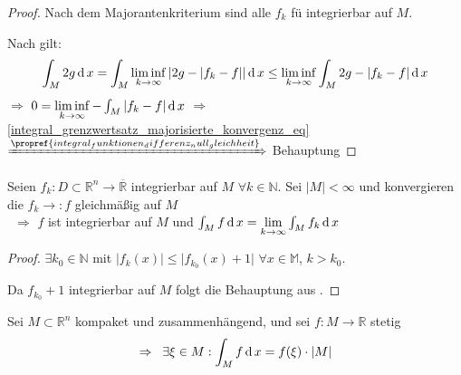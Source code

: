 \begin{proof}
	Nach dem Majorantenkriterium sind alle $f_k$ \gls{fü} integrierbar auf $M$.
	
	Nach  gilt:\begin{align*}
		\int_M 2g \operatorname{d} x = \int_M \liminf\limits_{k\to\infty} \vert 2g - \vert f_k - f\vert \vert \operatorname{d} x \le \liminf\limits_{k\to\infty} \int_M 2g - \vert f_k - f \vert \operatorname{d} x
	\end{align*}
	$\Rightarrow$ $0 = \liminf\limits_{k\to\infty} -\int_M \vert f_k - f\vert \operatorname{d} x$ $\Rightarrow$ \eqref{integral_grenzwertsatz_majorisierte_konvergenz_eq} $\xRightarrow{\propref{integral_funktionen_differenz_null_gleichheit}}$ Behauptung
\end{proof}

\begin{conclusion}
	Seien $f_k:D\subset\mathbb{R}^n\to\overline{\mathbb{R}}$ integrierbar auf $M$ $\forall k\in\mathbb{N}$. Sei $\vert M \vert < \infty$ und konvergieren die $f_k \to: f$ gleichmäßig auf $M$ \\
	\ $\Rightarrow$ $f$ ist integrierbar auf $M$ und $\int_M f \operatorname{d} x = \lim\limits_{k\to\infty} \int_M f_k \operatorname{d} x$
\end{conclusion}

\begin{proof}
	$\exists k_0\in \mathbb{N}$ mit $\vert f_k(x) \vert \le \vert f_{k_0}(x) + 1\vert$ $\forall x\in\mathbb{M}$, $k > k_0$.
	
	Da $f_{k_0}+1$ integrierbar auf $M$ folgt die Behauptung aus .
\end{proof}

\begin{theorem}
	Sei $M\subset\mathbb{R}^n$ kompaket und zusammenhängend, und sei $f:M\to\mathbb{R}$ stetig
	\begin{align*}
	\Rightarrow\;\;\exists \xi\in M: \int_M f \operatorname{d} x = f(\xi) \cdot \vert M \vert
	\end{align*}
\end{theorem}

